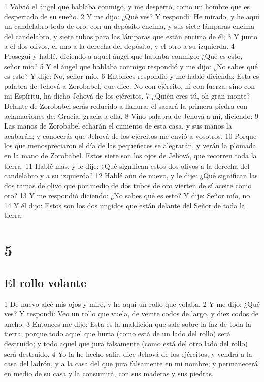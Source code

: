1 Volvió el ángel que hablaba conmigo, y me despertó, como un hombre que es despertado de su sueño.
2 Y me dijo: ¿Qué ves? Y respondí: He mirado, y he aquí un candelabro todo de oro, con un depósito encima, y sus siete lámparas encima del candelabro, y siete tubos para las lámparas que están encima de él;
3 Y junto a él dos olivos, el uno a la derecha del depósito, y el otro a su izquierda.
4 Proseguí y hablé, diciendo a aquel ángel que hablaba conmigo: ¿Qué es esto, señor mío?
5 Y el ángel que hablaba conmigo respondió y me dijo: ¿No sabes qué es esto? Y dije: No, señor mío.
6 Entonces respondió y me habló diciendo: Esta es palabra de Jehová a Zorobabel, que dice: No con ejército, ni con fuerza, sino con mi Espíritu, ha dicho Jehová de los ejércitos.
7 ¿Quién eres tú, oh gran monte? Delante de Zorobabel serás reducido a llanura; él sacará la primera piedra con aclamaciones de: Gracia, gracia a ella.
8 Vino palabra de Jehová a mí, diciendo:
9 Las manos de Zorobabel echarán el cimiento de esta casa, y sus manos la acabarán; y conocerás que Jehová de los ejércitos me envió a vosotros.
10 Porque los que menospreciaron el día de las pequeñeces se alegrarán, y verán la plomada en la mano de Zorobabel. Estos siete son los ojos de Jehová, que recorren toda la tierra.
11 Hablé más, y le dije: ¿Qué significan estos dos olivos a la derecha del candelabro y a su izquierda?
12 Hablé aún de nuevo, y le dije: ¿Qué significan las dos ramas de olivo que por medio de dos tubos de oro vierten de sí aceite como oro?
13 Y me respondió diciendo: ¿No sabes qué es esto? Y dije: Señor mío, no.
14 Y él dijo: Estos son los dos ungidos que están delante del Señor de toda la tierra.

\chapter{5}

\section*{El rollo volante}

1 De nuevo alcé mis ojos y miré, y he aquí un rollo que volaba.
2 Y me dijo: ¿Qué ves? Y respondí: Veo un rollo que vuela, de veinte codos   de largo, y diez codos de ancho.
3 Entonces me dijo: Esta es la maldición que sale sobre la faz de toda la tierra; porque todo aquel que hurta (como está de un lado del rollo) será destruido; y todo aquel que jura falsamente (como está del otro lado del rollo) será destruido.
4 Yo la he hecho salir, dice Jehová de los ejércitos, y vendrá a la casa del ladrón, y a la casa del que jura falsamente en mi nombre; y permanecerá en medio de su casa y la consumirá, con sus maderas y sus piedras.

